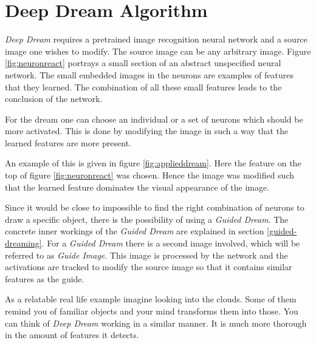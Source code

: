 

\section{Deep Dream Algorithm}
\label{sec:how}
\label{sec:visual-aspects}

\emph{Deep Dream} requires a pretrained image recognition neural network and a source image one wishes to modify.
The source image can be any arbitrary image.
Figure \ref{fig:neuronreact} portrays a small section of an abstract unspecified neural network.
The small embedded images in the neurons are examples of features that they learned.
The combination of all these small features leads to the conclusion of the network.

For the dream one can choose an individual or a set of neurons which should be more activated.
This is done by modifying the image in such a way that the learned features are more present.

An example of this is given in figure \ref{fig:applieddream}.
Here the feature on the top of figure \ref{fig:neuronreact} was chosen.
Hence the image was modified such that the learned feature dominates the visual appearance of the image.

Since it would be close to impossible to find the right combination of neurons to draw a specific object, there is the possibility of using a \textit{Guided Dream}.
The concrete inner workings of the \textit{Guided Dream} are explained in section \ref{guided-dreaming}.
For a \textit{Guided Dream} there is a second image involved, which will be referred to as \textit{Guide Image}.
This image is processed by the network and the activations are tracked to modify the source image so that it contains similar features as the guide.

As a relatable real life example imagine looking into the clouds.
Some of them remind you of familiar objects and your mind transforms them into those.
You can think of \emph{Deep Dream} working in a similar manner.
It is much more thorough in the amount of features it detects.

